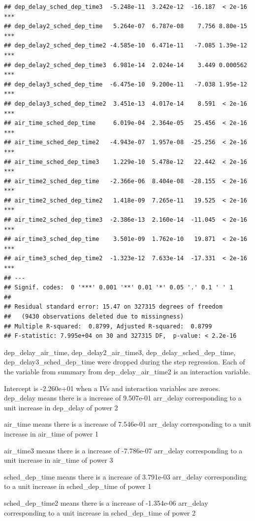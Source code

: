 \documentclass[
]{article}
\begin{document}
\begin{verbatim}
## dep_delay_sched_dep_time3  -5.248e-11  3.242e-12  -16.187  < 2e-16 ***
## dep_delay2_sched_dep_time   5.264e-07  6.787e-08    7.756 8.80e-15 ***
## dep_delay2_sched_dep_time2 -4.585e-10  6.471e-11   -7.085 1.39e-12 ***
## dep_delay2_sched_dep_time3  6.981e-14  2.024e-14    3.449 0.000562 ***
## dep_delay3_sched_dep_time  -6.475e-10  9.200e-11   -7.038 1.95e-12 ***
## dep_delay3_sched_dep_time2  3.451e-13  4.017e-14    8.591  < 2e-16 ***
## air_time_sched_dep_time     6.019e-04  2.364e-05   25.456  < 2e-16 ***
## air_time_sched_dep_time2   -4.943e-07  1.957e-08  -25.256  < 2e-16 ***
## air_time_sched_dep_time3    1.229e-10  5.478e-12   22.442  < 2e-16 ***
## air_time2_sched_dep_time   -2.366e-06  8.404e-08  -28.155  < 2e-16 ***
## air_time2_sched_dep_time2   1.418e-09  7.265e-11   19.525  < 2e-16 ***
## air_time2_sched_dep_time3  -2.386e-13  2.160e-14  -11.045  < 2e-16 ***
## air_time3_sched_dep_time    3.501e-09  1.762e-10   19.871  < 2e-16 ***
## air_time3_sched_dep_time2  -1.323e-12  7.633e-14  -17.331  < 2e-16 ***
## ---
## Signif. codes:  0 '***' 0.001 '**' 0.01 '*' 0.05 '.' 0.1 ' ' 1
## 
## Residual standard error: 15.47 on 327315 degrees of freedom
##   (9430 observations deleted due to missingness)
## Multiple R-squared:  0.8799, Adjusted R-squared:  0.8799 
## F-statistic: 7.995e+04 on 30 and 327315 DF,  p-value: < 2.2e-16
\end{verbatim}

dep\_delay\_air\_time, dep\_delay2\_air\_time3,
dep\_delay\_sched\_dep\_time, dep\_delay3\_sched\_dep\_time were dropped
during the step regression. Each of the variable from summary from
dep\_delay\_air\_time2 is an interaction variable.

Intercept is -2.260e+01 when a IVs and interaction variables are
zeroes.\\
dep\_delay means there is a increase of 9.507e-01 arr\_delay
corresponding to a unit increase in dep\_delay of power 2

air\_time means there is a increase of 7.546e-01 arr\_delay
corresponding to a unit increase in air\_time of power 1

air\_time3 means there is a increase of -7.786e-07 arr\_delay
corresponding to a unit increase in air\_time of power 3

sched\_dep\_time means there is a increase of 3.791e-03 arr\_delay
corresponding to a unit increase in sched\_dep\_time of power 1

sched\_dep\_time2 means there is a increase of -1.354e-06 arr\_delay
corresponding to a unit increase in sched\_dep\_time of power 2
\end{document}
